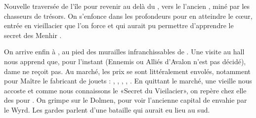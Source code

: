 \documentclass[11pt]{article}
\begin{document}
Nouvelle traversée de l'île pour revenir au delà du \bosquet{}, vers le l'ancien \tumulus{} , miné par les chasseurs de trésors. On s'enfonce dans les profondeurs pour en atteindre le c\oe{}ur, entrée en vieillacier que l'on force et qui aurait pu permettre d'apprendre le secret des Menhir \gain{\magic[1]}.

On arrive enfin à \loincomtat{} , au pied des murailles infranchissables de \tuathan{}. Une visite au hall nous apprend que, pour l'instant (Ennemis ou Alliés d'Avalon n'est pas décidé), dame \kincaid{} ne reçoit pas. Au marché, les prix se sont littéralement envolés, notamment pour Maître \dobromir{} le fabricant de jouets : , , , , . En quittant le marché, une vieille nous accoste et comme nous connaissons le «Secret du Vieilacier», on repère chez elle des \gain{\outilspierre} pour \rich[2]. On grimpe sur le Dolmen, pour voir l'ancienne capital de \tuathan{} envahie par le Wyrd. Les gardes parlent d'une bataille qui aurait eu lieu au sud.

\printindex
\end{document}

